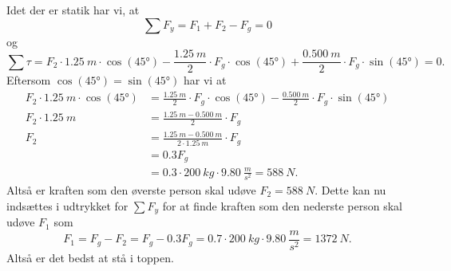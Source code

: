 \documentclass[12pt]{article}
\theoremstyle{definition}
\begin{document}
Idet der er statik har vi, at
\[ 
  \sum F_y = F_1 + F_2 - F_g = 0
\]
og
\[ 
  \sum \tau = F_2 \cdot \qty{1,25}{m} \cdot \cos(\ang{45}) - \frac{\qty{1,25}{m}}{2} \cdot F_g \cdot \cos(\ang{45}) + \frac{\qty{0,500}{m}}{2} \cdot F_g \cdot \sin(\ang{45}) = 0
.\]
Eftersom $\cos(\ang{45}) = \sin(\ang{45})$ har vi at
\begin{align*}
  F_2 \cdot \qty{1,25}{m} \cdot \cos(\ang{45}) &= \frac{\qty{1,25}{m}}{2}\cdot F_g \cdot \cos(\ang{45}) - \frac{\qty{0,500}{m}}{2}\cdot F_g \cdot \sin(\ang{45}) \\
  F_2 \cdot \qty{1,25}{m} &= \frac{\qty{1,25}{m} - \qty{0,500}{m}}{2}\cdot F_g \\
  F_2 &= \frac{\qty{1,25}{m} - \qty{0,500}{m}}{2 \cdot \qty{1,25}{m}} \cdot F_g \\
  &= \num{0,3} F_g \\
  &= \num{0,3} \cdot \qty{200}{kg} \cdot \qty{9,80}{\frac{m}{s^2}} = \qty{588}{N} 
.\end{align*}
Altså er kraften som den øverste person skal udøve $F_2 = \qty{588}{N}$. Dette kan nu indsættes i udtrykket for $\sum F_y$ for at finde kraften som den nederste person skal udøve $F_1$ som
\[ 
F_1 = F_g - F_2 = F_g - \num{0,3}F_g = \num{0,7} \cdot \qty{200}{kg} \cdot \qty{9,80}{\frac{m}{s^2}} = \qty{1372}{N} 
.\]
Altså er det bedst at stå i toppen.
\end{document}
